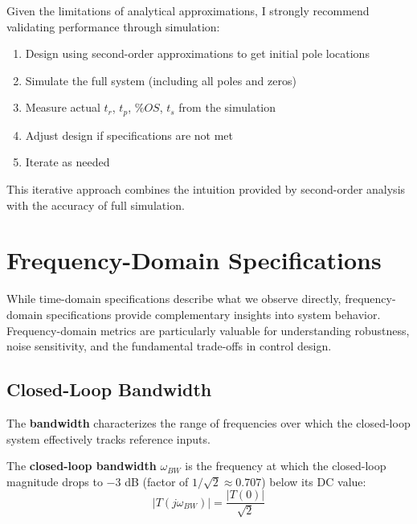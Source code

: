 Given the limitations of analytical approximations, I strongly recommend validating performance through simulation:

\begin{enumerate}
    \item Design using second-order approximations to get initial pole locations
    \item Simulate the full system (including all poles and zeros)
    \item Measure actual $t_r$, $t_p$, $\%OS$, $t_s$ from the simulation
    \item Adjust design if specifications are not met
    \item Iterate as needed
\end{enumerate}

This iterative approach combines the intuition provided by second-order analysis with the accuracy of full simulation.


\section{Frequency-Domain Specifications}
\label{sec:freq_domain_specs}

While time-domain specifications describe what we observe directly, frequency-domain specifications provide complementary insights into system behavior. Frequency-domain metrics are particularly valuable for understanding robustness, noise sensitivity, and the fundamental trade-offs in control design.

\subsection{Closed-Loop Bandwidth}
\label{subsec:bandwidth}

The \textbf{bandwidth} characterizes the range of frequencies over which the closed-loop system effectively tracks reference inputs.

\begin{definition}[Bandwidth]
The \textbf{closed-loop bandwidth} $\omega_{BW}$ is the frequency at which the closed-loop magnitude drops to $-3$ dB (factor of $1/\sqrt{2} \approx 0.707$) below its DC value:
\begin{equation}
    |T(j\omega_{BW})| = \frac{|T(0)|}{\sqrt{2}}
\end{equation}
\end{definition}

